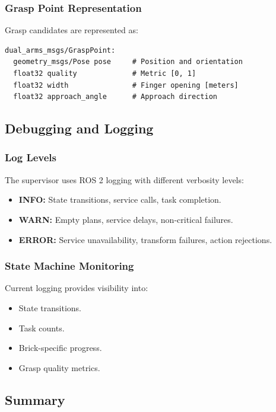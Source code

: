 \subsubsection{Grasp Point Representation}

Grasp candidates are represented as:
\begin{verbatim}
dual_arms_msgs/GraspPoint:
  geometry_msgs/Pose pose     # Position and orientation
  float32 quality             # Metric [0, 1]
  float32 width               # Finger opening [meters]
  float32 approach_angle      # Approach direction
\end{verbatim}

\subsection{Debugging and Logging}

\subsubsection{Log Levels}

The supervisor uses ROS 2 logging with different verbosity levels:
\begin{itemize}
    \item \textbf{INFO:} State transitions, service calls, task completion.
    \item \textbf{WARN:} Empty plans, service delays, non-critical failures.
    \item \textbf{ERROR:} Service unavailability, transform failures, action rejections.
\end{itemize}

\subsubsection{State Machine Monitoring}

Current logging provides visibility into:
\begin{itemize}
    \item State transitions.
    \item Task counts.
    \item Brick-specific progress.
    \item Grasp quality metrics.
\end{itemize}

\subsection{Summary}

